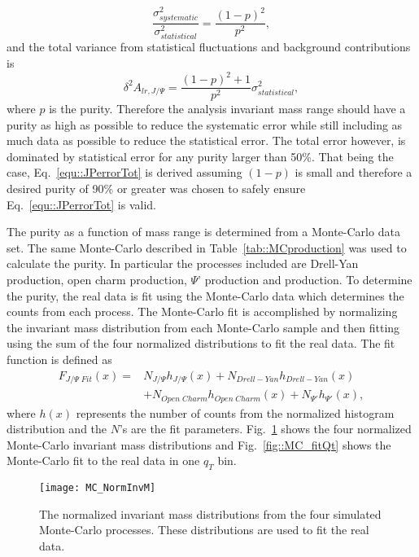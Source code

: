 \begin{equation}
  \frac{\sigma^2_{systematic}}{\sigma^2_{statistical}} = \frac{(1-p)^2}{p^2},
\end{equation}
\noindent
and the total variance from statistical fluctuations and background
contributions is
\begin{equation}
  \delta^2 A_{lr,J/\Psi} = \frac{(1-p)^2 + 1}{p^2}\sigma^2_{statistical},
  \label{equ::JPerrorTot}
\end{equation}
where $p$ is the {\jp} purity.  Therefore the analysis invariant mass range
should have a {\jp} purity as high as possible to reduce the systematic error
while still including as much data as possible to reduce the statistical error.
The total error however, is dominated by statistical error for any purity larger
than 50\%.  That being the case, Eq.~\ref{equ::JPerrorTot} is derived assuming
$(1-p)$ is small and therefore a desired purity of 90\% or greater was chosen to
safely ensure Eq.~\ref{equ::JPerrorTot} is valid.

The {\jp} purity as a function of mass range is determined from a Monte-Carlo
data set.  The same Monte-Carlo described in Table~\ref{tab::MCproduction} was
used to calculate the {\jp} purity.  In particular the processes included are
Drell-Yan production, open charm production, $\Psi$' production and {\jp}
production.  To determine the purity, the real data is fit using the Monte-Carlo
data which determines the counts from each process.  The Monte-Carlo fit is
accomplished by normalizing the invariant mass distribution from each
Monte-Carlo sample and then fitting using the sum of the four normalized
distributions to fit the real data.  The fit function is defined as
\begin{align}
  F_{J/\Psi \;Fit}(x) = &N_{J/\Psi}h_{J/\Psi}(x) + N_{Drell-Yan}h_{Drell-Yan}(x)
  \\ \nonumber
  &+ N_{Open\;Charm}h_{Open\;Charm}(x)+N_{\Psi'}h_{\Psi'}(x),
\end{align}
\noindent
where $h(x)$ represents the number of counts from the normalized histogram
distribution and the $N$'s are the fit parameters.  Fig.~\ref{fig::MC_NormInvM}
shows the four normalized Monte-Carlo invariant mass distributions and
Fig.~\ref{fig::MC_fitQt} shows the Monte-Carlo fit to the real data in one $q_T$
bin.

\begin{figure}[h!t]
  \centering \texttt{[image: MC\_NormInvM]}
  \caption{The normalized invariant mass distributions from the four simulated
    Monte-Carlo processes.  These distributions are used to fit the real data.}
  \label{fig::MC_NormInvM}
\end{figure}

